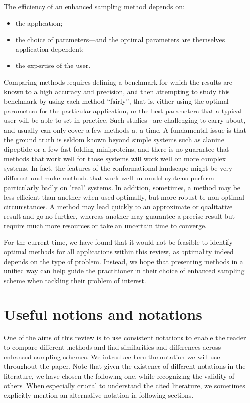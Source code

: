 \documentclass[9pt,review]{livecoms}
\begin{document}
The efficiency of an enhanced sampling method depends on:
\begin{itemize}
 \item the application;
 \item the choice of parameters---and the optimal parameters are themselves application dependent;
 \item the expertise of the user.
\end{itemize}

Comparing methods requires defining a benchmark for which the results are known to a high accuracy and precision, and then attempting to study this benchmark by using each method ``fairly'', that is, either using the optimal parameters for the particular application, or the best parameters that a typical user will be able to set in practice. Such studies~\cite{Rizzi:JCAMD:2020a,Hrustak:JCP:2018} are challenging to carry about, and usually can only cover a few methods at a time.  A fundamental issue is that the ground truth is seldom known beyond simple systems such as alanine dipeptide or a few fast-folding miniproteins, and there is no guarantee that methods that work well for those systems will work well on more complex systems. In fact, the features of the conformational landscape might be very different and make methods that work well on model systems perform particularly badly on "real" systems. In addition, sometimes, a method may be less efficient than another when used optimally, but more robust to non-optimal circumstances.
A method may lead quickly to an approximate or qualitative result and go no further, whereas another may guarantee a precise result but require much more resources or take an uncertain time to converge.

For the current time, we have found that it would not be feasible to identify optimal methods for all applications within this review, as optimality indeed depends on the type of problem. Instead, we hope that presenting methods in a unified way can help guide the practitioner in their choice of enhanced sampling scheme when tackling their problem of interest.




\section{Useful notions and notations}
\label{sec:Notion_Notation}

One of the aims of this review is to use consistent notations to enable the reader to compare different methods and find similarities and differences across enhanced sampling
schemes. We introduce here the notation we will use throughout the paper. Note that given the existence of different notations in the literature, we have chosen the following one, while recognizing the validity of others. When especially crucial to understand the cited literature, we sometimes explicitly mention an alternative notation in following sections.
\end{document}
